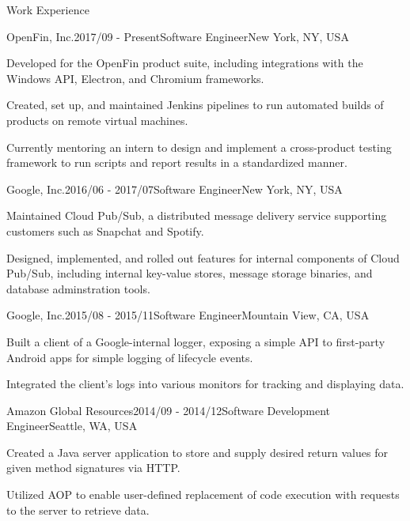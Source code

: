 \documentclass{resume} %
\begin{document}

\begin{rSection}{Work Experience}

\begin{rSubsection}{OpenFin, Inc.}{2017/09 - Present}{Software Engineer}{New York, NY, USA}
\item Developed for the OpenFin product suite, including integrations with the Windows API, Electron, and Chromium frameworks.
\item Created, set up, and maintained Jenkins pipelines to run automated builds of products on remote virtual machines.
\item Currently mentoring an intern to design and implement a cross-product testing framework to run scripts and report results in a standardized manner.
\end{rSubsection}

\begin{rSubsection}{Google, Inc.}{2016/06 - 2017/07}{Software Engineer}{New York, NY, USA}
\item Maintained Cloud Pub/Sub, a distributed message delivery service supporting customers such as Snapchat and Spotify.
\item Designed, implemented, and rolled out features for internal components of Cloud Pub/Sub, including internal key-value stores, message storage binaries, and database adminstration tools.
\end{rSubsection}

\begin{rSubsection}{Google, Inc.}{2015/08 - 2015/11}{Software Engineer}{Mountain View, CA, USA}
\item Built a client of a Google-internal logger, exposing a simple API to first-party Android apps for simple logging of lifecycle events.
\item Integrated the client's logs into various monitors for tracking and displaying data.
\end{rSubsection}

\begin{rSubsection}{Amazon Global Resources}{2014/09 - 2014/12}{Software Development Engineer}{Seattle, WA, USA}
\item Created a Java server application to store and supply desired return values for given method signatures via HTTP.
\item Utilized AOP to enable user-defined replacement of code execution with requests to the server to retrieve data.
\end{rSubsection}


\end{rSection}
\end{document}
